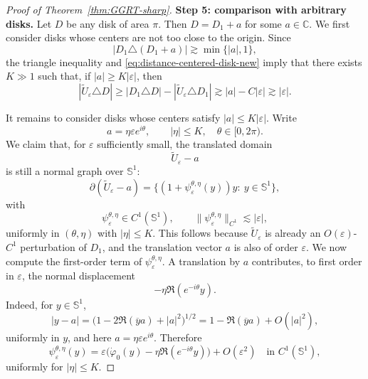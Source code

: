\documentclass[a4paper,11pt,reqno]{amsart}
\numberwithin{equation}{section}
\theoremstyle{plain} %
\theoremstyle{definition} %
\theoremstyle{remark}
\newcommand{\C}{\mathbb{C}}
\begin{document}
\begin{proof}[Proof of Theorem~\ref{thm:GGRT-sharp}]
\medskip
\noindent
{\bf Step 5: comparison with arbitrary disks.} Let $D$ be any disk of area $\pi$. Then $D=D_1+a$ for some $a\in \C$. We first consider disks whose centers are not too close to the origin.
Since
\[
|D_1\triangle (D_1+a)|
\gtrsim \min\{|a|,1\},
\]
the triangle inequality and \eqref{eq:distance-centered-disk-new} imply that
there exists $K\gg 1$ such that, if $|a|\geq K|\varepsilon|$, then
\begin{equation}\label{eq:far-disks-new}
|\widetilde U_\varepsilon \triangle D|
\geq
|D_1\triangle D|-|\widetilde U_\varepsilon\triangle D_1|
\gtrsim
|a|-C|\varepsilon|
\gtrsim
|\varepsilon|.
\end{equation}

It remains to consider disks whose centers satisfy $|a|\leq K|\varepsilon|$.
Write
\[
a=\eta \varepsilon e^{i\theta},
\qquad
|\eta|\leq K,
\quad
\theta\in [0,2\pi).
\]
We claim that, for $\varepsilon$ sufficiently small, the translated domain
\[
\widetilde U_\varepsilon-a
\]
is still a normal graph over $\mathbb S^1$:
\[
\partial(\widetilde U_\varepsilon-a)
=
\{(1+\psi_\varepsilon^{\theta,\eta}(y))y:\ y\in \mathbb S^1\},
\]
with
\[
\psi_\varepsilon^{\theta,\eta}\in C^1(\mathbb S^1),
\qquad
\|\psi_\varepsilon^{\theta,\eta}\|_{C^1}\lesssim |\varepsilon|,
\]
uniformly in $(\theta,\eta)$ with $|\eta|\leq K$. This follows because
$\widetilde U_\varepsilon$ is already an $O(\varepsilon)$-$C^1$ perturbation of
$D_1$, and the translation vector $a$ is also of order $\varepsilon$. We now compute the first-order term of $\psi_\varepsilon^{\theta,\eta}$.
A translation by $a$ contributes, to first order in $\varepsilon$, the normal
displacement
\[
-\eta \Re(e^{-i\theta}y).
\]
Indeed, for \(y\in \mathbb S^1\),
\[
|y-a|
=
\bigl(1-2\Re(\overline y a)+|a|^2\bigr)^{1/2}
=
1-\Re(\overline y a)+O(|a|^2),
\]
uniformly in \(y\), and here \(a=\eta\varepsilon e^{i\theta}\).
Therefore
\begin{equation}\label{eq:psi-expansion-new}
\psi_\varepsilon^{\theta,\eta}(y)
=
\varepsilon\Big(\dot\varphi_0(y)-\eta \Re(e^{-i\theta}y)\Big)
+
O(\varepsilon^2)
\quad \text{in } C^1(\mathbb S^1),
\end{equation}
uniformly for $|\eta|\leq K$.


\end{proof}
\end{document}
